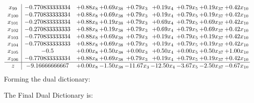 \documentclass[8pt]{article}
\begin{document}
\[\begin{array}{c| c c@{\hskip 2pt} c@{\hskip 2pt} c@{\hskip 2pt} c@{\hskip 2pt} c@{\hskip 2pt} c@{\hskip 2pt} c@{\hskip 2pt} }
 x_{99}   &  -0.770833333334 & +  0.88 x_{8} & +  0.69 x_{38} & +  0.79 x_{3} & +  0.19 x_{4} & +  0.79 x_{5} & +  0.19 x_{37} & +  0.42 x_{10}\\
 x_{100}   &  -0.770833333334 & +  0.88 x_{8} & +  0.69 x_{38} & +  0.79 x_{3} & +  0.19 x_{4} & +  0.79 x_{5} & +  0.19 x_{37} & +  0.42 x_{10}\\
 x_{101}   &  -0.270833333334 & +  0.88 x_{8} & +  0.19 x_{38} & +  0.79 x_{3} & +  0.69 x_{4} & +  0.79 x_{5} & +  0.69 x_{37} & +  0.42 x_{10}\\
 x_{102}   &  -0.270833333333 & +  0.88 x_{8} & +  0.19 x_{38} & +  0.79 x_{3} & +  0.69 x_{4} & +  0.79 x_{5} & +  0.69 x_{37} & +  0.42 x_{10}\\
 x_{103}   &  -0.770833333334 & +  0.88 x_{8} & +  0.69 x_{38} & +  0.79 x_{3} & +  0.19 x_{4} & +  0.79 x_{5} & +  0.19 x_{37} & +  0.42 x_{10}\\
 x_{104}   &  -0.770833333333 & +  0.88 x_{8} & +  0.69 x_{38} & +  0.79 x_{3} & +  0.19 x_{4} & +  0.79 x_{5} & +  0.19 x_{37} & +  0.42 x_{10}\\
 x_{105}   &  -0.5 & +  0.00 x_{8} & +  0.50 x_{38} & +  0.00 x_{3} & +  0.50 x_{4} & +  0.00 x_{5} & +  0.50 x_{37} & +  1.00 x_{10}\\
 x_{106}   &  -0.770833333334 & +  0.88 x_{8} & +  0.69 x_{38} & +  0.79 x_{3} & +  0.19 x_{4} & +  0.79 x_{5} & +  0.19 x_{37} & +  0.42 x_{10}\\
\hline
z    &  -9.16666666667 & +  0.00 x_{8} & -1.50 x_{38} & -11.67 x_{3} & -12.50 x_{4} & -3.67 x_{5} & -2.50 x_{37} & -0.67 x_{10}\\
\end{array}\]
Forming the dual dictionary:

The Final Dual Dictionary is: 
\end{document}
